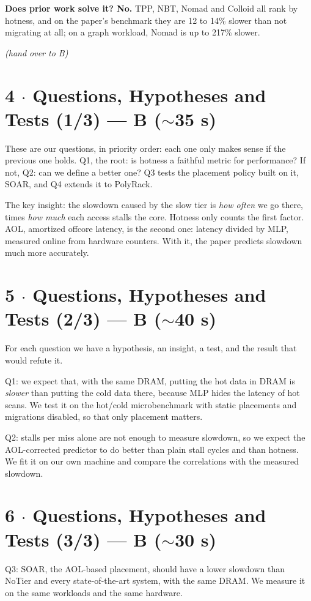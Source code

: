 \documentclass[11pt]{article}
\begin{document}
\textbf{Does prior work solve it? No.} TPP, NBT, Nomad and Colloid all rank by
hotness, and on the paper's benchmark they are 12 to 14\% slower than not
migrating at all; on a graph workload, Nomad is up to 217\% slower.

\emph{(hand over to B)}

\section{4 $\cdot$ Questions, Hypotheses and Tests (1/3) --- B ($\sim$35 s)}
These are our questions, in priority order: each one only makes sense if the
previous one holds. Q1, the root: is hotness a faithful metric for
performance? If not, Q2: can we define a better one? Q3 tests the placement
policy built on it, SOAR, and Q4 extends it to PolyRack.

The key insight: the slowdown caused by the slow tier is \emph{how often} we
go there, times \emph{how much} each access stalls the core. Hotness only
counts the first factor. AOL, amortized offcore latency, is the second one:
latency divided by MLP, measured online from hardware counters. With it, the
paper predicts slowdown much more accurately.

\section{5 $\cdot$ Questions, Hypotheses and Tests (2/3) --- B ($\sim$40 s)}
For each question we have a hypothesis, an insight, a test, and the result
that would refute it.

Q1: we expect that, with the same DRAM, putting the hot data in DRAM is
\emph{slower} than putting the cold data there, because MLP hides the latency
of hot scans. We test it on the hot/cold microbenchmark with static placements
and migrations disabled, so that only placement matters.

Q2: stalls per miss alone are not enough to measure slowdown, so we expect the
AOL-corrected predictor to do better than plain stall cycles and than hotness.
We fit it on our own machine and compare the correlations with the measured
slowdown.

\section{6 $\cdot$ Questions, Hypotheses and Tests (3/3) --- B ($\sim$30 s)}
Q3: SOAR, the AOL-based placement, should have a lower slowdown than NoTier
and every state-of-the-art system, with the same DRAM. We measure it on the
same workloads and the same hardware.
\end{document}
